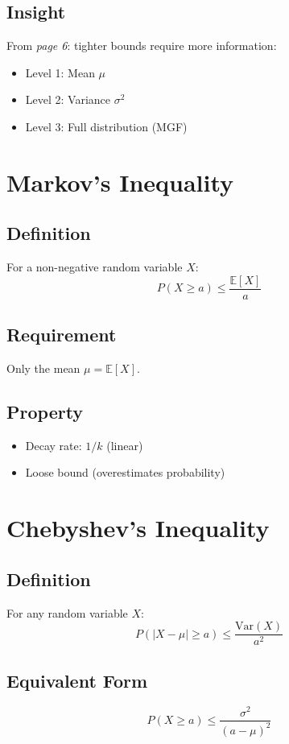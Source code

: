 \documentclass[12pt]{article}
\begin{document}
\subsection*{Insight}
From \textit{page 6}: tighter bounds require more information:
\begin{itemize}
    \item Level 1: Mean $\mu$
    \item Level 2: Variance $\sigma^2$
    \item Level 3: Full distribution (MGF)
\end{itemize}

\section*{Markov's Inequality}

\subsection*{Definition}
For a non-negative random variable $X$:
\[
P(X \ge a) \le \frac{\mathbb{E}[X]}{a}
\]

\subsection*{Requirement}
Only the mean $\mu = \mathbb{E}[X]$.

\subsection*{Property}
\begin{itemize}
    \item Decay rate: $1/k$ (linear)
    \item Loose bound (overestimates probability)
\end{itemize}

\section*{Chebyshev's Inequality}

\subsection*{Definition}
For any random variable $X$:
\[
P(|X - \mu| \ge a) \le \frac{\mathrm{Var}(X)}{a^2}
\]

\subsection*{Equivalent Form}
\[
P(X \ge a) \le \frac{\sigma^2}{(a - \mu)^2}
\]
\end{document}
